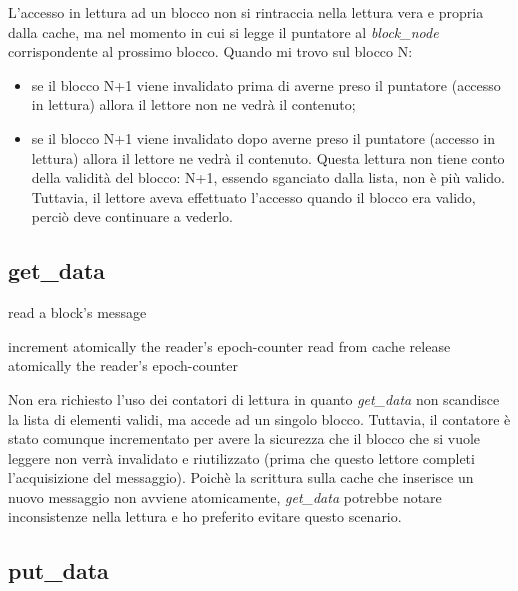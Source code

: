 \documentclass[a4paper,12pt,oneside]{book}
\begin{document}
L'accesso in lettura ad un blocco non si rintraccia nella lettura vera e propria dalla cache, ma nel momento in cui si legge il puntatore al \emph{block\_node} corrispondente al prossimo blocco. Quando mi trovo sul blocco N:
\begin{itemize}
		\item se il blocco N+1 viene invalidato prima di averne preso il puntatore (accesso in lettura) allora il lettore non ne vedrà il contenuto;
		\item se il blocco N+1 viene invalidato dopo averne preso il puntatore (accesso in lettura) allora il lettore ne vedrà il contenuto. Questa lettura non tiene conto della validità del blocco: N+1, essendo sganciato dalla lista, non è più valido. Tuttavia, il lettore aveva effettuato l'accesso quando il blocco era valido, perciò deve continuare a vederlo.
\end{itemize}


	\subsection{get\_data}
\begin{algorithm}[H]
\caption{read a block's message}
\begin{algorithmic}
    	\State increment atomically the reader's epoch-counter
	    	\State read from cache
	\EndIf
	\State release atomically the reader's epoch-counter
    \EndIf
\end{algorithmic}
\end{algorithm}

	Non era richiesto l'uso dei contatori di lettura in quanto \emph{get\_data} non scandisce la lista di elementi validi, ma accede ad un singolo blocco. Tuttavia, il contatore è stato comunque incrementato per avere la sicurezza che il blocco che si vuole leggere non verrà invalidato e riutilizzato (prima che questo lettore completi l'acquisizione del messaggio). Poichè la scrittura sulla cache che inserisce un nuovo messaggio non avviene atomicamente, \emph{get\_data} potrebbe notare inconsistenze nella lettura e ho preferito evitare questo scenario.


	\subsection{put\_data}
\end{document}
